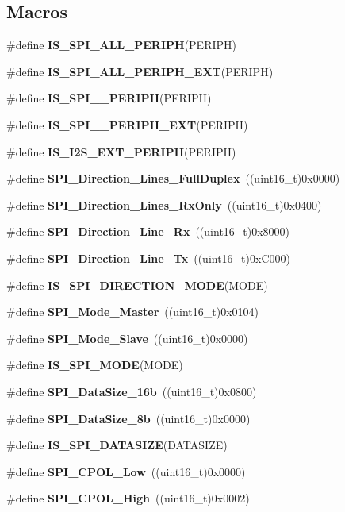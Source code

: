 \subsection*{Macros}
\begin{DoxyCompactItemize}
\item 
\#define \textbf{ I\+S\+\_\+\+S\+P\+I\+\_\+\+A\+L\+L\+\_\+\+P\+E\+R\+I\+PH}(P\+E\+R\+I\+PH)
\item 
\#define \textbf{ I\+S\+\_\+\+S\+P\+I\+\_\+\+A\+L\+L\+\_\+\+P\+E\+R\+I\+P\+H\+\_\+\+E\+XT}(P\+E\+R\+I\+PH)
\item 
\#define \textbf{ I\+S\+\_\+\+S\+P\+I\+\_\+\_\+\+P\+E\+R\+I\+PH}(P\+E\+R\+I\+PH)
\item 
\#define \textbf{ I\+S\+\_\+\+S\+P\+I\+\_\+\_\+\+P\+E\+R\+I\+P\+H\+\_\+\+E\+XT}(P\+E\+R\+I\+PH)
\item 
\#define \textbf{ I\+S\+\_\+\+I2\+S\+\_\+\+E\+X\+T\+\_\+\+P\+E\+R\+I\+PH}(P\+E\+R\+I\+PH)
\item 
\#define \textbf{ S\+P\+I\+\_\+\+Direction\+\_\+Lines\+\_\+\+Full\+Duplex}~((uint16\+\_\+t)0x0000)
\item 
\#define \textbf{ S\+P\+I\+\_\+\+Direction\+\_\+Lines\+\_\+\+Rx\+Only}~((uint16\+\_\+t)0x0400)
\item 
\#define \textbf{ S\+P\+I\+\_\+\+Direction\+\_\+Line\+\_\+\+Rx}~((uint16\+\_\+t)0x8000)
\item 
\#define \textbf{ S\+P\+I\+\_\+\+Direction\+\_\+Line\+\_\+\+Tx}~((uint16\+\_\+t)0x\+C000)
\item 
\#define \textbf{ I\+S\+\_\+\+S\+P\+I\+\_\+\+D\+I\+R\+E\+C\+T\+I\+O\+N\+\_\+\+M\+O\+DE}(M\+O\+DE)
\item 
\#define \textbf{ S\+P\+I\+\_\+\+Mode\+\_\+\+Master}~((uint16\+\_\+t)0x0104)
\item 
\#define \textbf{ S\+P\+I\+\_\+\+Mode\+\_\+\+Slave}~((uint16\+\_\+t)0x0000)
\item 
\#define \textbf{ I\+S\+\_\+\+S\+P\+I\+\_\+\+M\+O\+DE}(M\+O\+DE)
\item 
\#define \textbf{ S\+P\+I\+\_\+\+Data\+Size\+\_\+16b}~((uint16\+\_\+t)0x0800)
\item 
\#define \textbf{ S\+P\+I\+\_\+\+Data\+Size\+\_\+8b}~((uint16\+\_\+t)0x0000)
\item 
\#define \textbf{ I\+S\+\_\+\+S\+P\+I\+\_\+\+D\+A\+T\+A\+S\+I\+ZE}(D\+A\+T\+A\+S\+I\+ZE)
\item 
\#define \textbf{ S\+P\+I\+\_\+\+C\+P\+O\+L\+\_\+\+Low}~((uint16\+\_\+t)0x0000)
\item 
\#define \textbf{ S\+P\+I\+\_\+\+C\+P\+O\+L\+\_\+\+High}~((uint16\+\_\+t)0x0002)

\end{DoxyCompactItemize}
